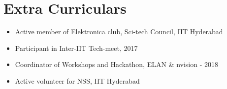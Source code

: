 \documentclass[11pt]{article} %
\begin{document}


\hline

\section{Extra Curriculars}
\begin{itemize}
    \item Active member of Elektronica club, Sci-tech Council, IIT Hyderabad
    \item Participant in Inter-IIT Tech-meet, 2017
    \item Coordinator of Workshops and Hackathon, ELAN \& nvision - 2018
    \item Active volunteer for NSS, IIT Hyderabad
\end{itemize}
\end{document}
